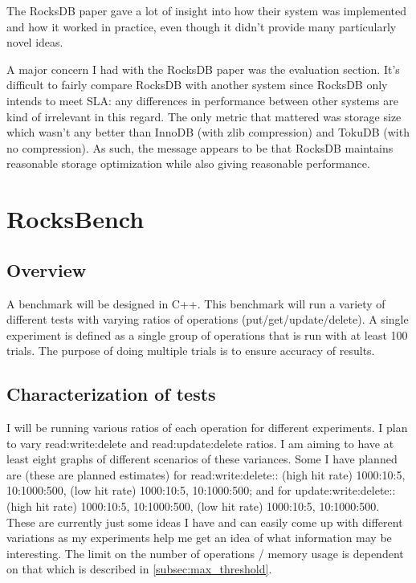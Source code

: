 \documentclass{article}
\begin{document}

The RocksDB paper gave a lot of insight into how their system was implemented
and how it worked in practice, even though it didn't provide many particularly
novel ideas.

A major concern I had with the RocksDB paper was the evaluation section. It's
difficult to fairly compare RocksDB with another system since RocksDB only
intends to meet SLA: any differences in performance between other systems are
kind of irrelevant in this regard. The only metric that mattered was storage
size which wasn't any better than InnoDB (with zlib compression) and TokuDB
(with no compression). As such, the message appears to be that RocksDB maintains
reasonable storage optimization while also giving reasonable performance.

\section{RocksBench}

\subsection{Overview}

A benchmark will be designed in C++. This benchmark will run a variety of
different tests with varying ratios of operations (put/get/update/delete). A
single experiment is defined as a single group of operations that is run with at
least 100 trials. The purpose of doing multiple trials is to ensure accuracy of
results.

\subsection{Characterization of tests}
\label{subsec:characterization_tests}

I will be running various ratios of each operation for different experiments. I
plan to vary read:write:delete and read:update:delete ratios. I am aiming to
have at least eight graphs of different scenarios of these variances. Some I
have planned are (these are planned estimates) for read:write:delete:: (high hit
rate) 1000:10:5, 10:1000:500, (low hit rate) 1000:10:5, 10:1000:500; and for
update:write:delete:: (high hit rate) 1000:10:5, 10:1000:500, (low hit rate)
1000:10:5, 10:1000:500. These are currently just some ideas I have and can
easily come up with different variations as my experiments help me get an idea
of what information may be interesting. The limit on the number of operations /
memory usage is dependent on that which is described in
\ref{subsec:max_threshold}.
\end{document}
